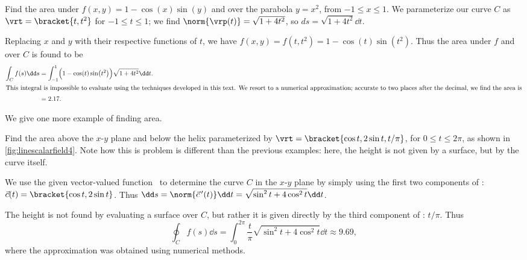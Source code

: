 \begin{example}\label{ex_linescalarfield5}%
Find the area under $f(x,y) = 1-\cos(x)\sin(y)$ and over the parabola $y = x^2$, from $-1\leq x\leq 1$.
\solution
We parameterize our curve $C$ as $\vrt =\bracket{t,t^2}$ for $-1\leq t\leq 1$; we find $\norm{\vrp(t)} = \sqrt{1+4t^2}$, so $ds = \sqrt{1+4t^2}\dd t$. 

Replacing $x$ and $y$ with their respective functions of $t$, we have $f(x,y) = f(t,t^2) = 1-\cos(t)\sin(t^2)$. Thus the area under $f$ and over $C$ is found to be
\begin{align*}
	\int_C f(s)\dd s
	&= \int_{-1}^1 \Bigl(1-\cos(t)\sin\bigl(t^2\bigr)\Bigr)\sqrt{1+4t^2}\dd t.\\
\intertext{This integral is impossible to evaluate using the techniques developed in this text. We resort to a numerical approximation; accurate to two places after the decimal, we find the area is}
	&= 2.17.
\end{align*}
\end{example}

We give one more example of finding area.

\begin{example}\label{ex_linescalarfield4}%
Find
%
%
the area above the $x$-$y$ plane and below the helix parameterized by $\vrt =\bracket{\cos t,2\sin t,t/\pi}$, for $0\leq t\leq 2\pi$, as shown in \autoref{fig:linescalarfield4}.
\solution
Note how this is problem is different than the previous examples: here, the height is not given by a surface, but by the curve itself. 

We use the given vector-valued function \vrt\ to determine the curve $C$ in the $x$-$y$ plane by simply using the first two components of \vrt: $\vec c(t) =\bracket{\cos t,2\sin t}$. Thus $\dd s = \norm{\vec c\,'(t)}\dd t = \sqrt{\sin^2t + 4\cos^2t}\dd t$. 

The height is not found by evaluating a surface over $C$, but rather it is given directly by the third component of \vrt: $t/\pi$. Thus
\[
\oint_C f(s)\dd s
= \int_0^{2\pi} \frac{t}{\pi}\sqrt{\sin^2t + 4\cos^2t}\dd t \approx 9.69,
\]
where the approximation was obtained using numerical methods.
\end{example}

